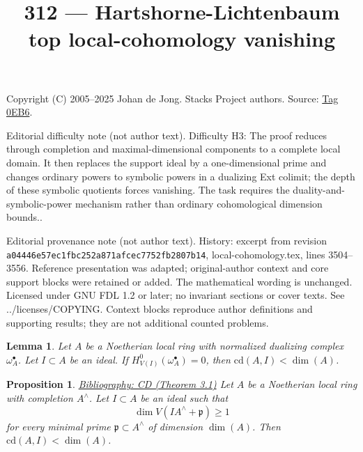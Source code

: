 \documentclass{amsart}
\newenvironment{reference}{\comment}{\endcomment}
\theoremstyle{plain}
\newtheorem{proposition}[subsection]{Proposition}
\newtheorem{lemma}[subsection]{Lemma}
\theoremstyle{definition}
\theoremstyle{remark}
\numberwithin{equation}{subsection}
\begin{document}
\title[Stacks Project, Tag 0EB6]{312 --- Hartshorne-Lichtenbaum top local-cohomology vanishing}
\maketitle
\noindent Copyright (C) 2005--2025 Johan de Jong. Stacks Project authors. Source: \href{https://stacks.math.columbia.edu/tag/0EB6}{Tag 0EB6}.

\noindent Editorial difficulty note (not author text). Difficulty H3: The proof reduces through completion and maximal-dimensional components to a complete local domain. It then replaces the support ideal by a one-dimensional prime and changes ordinary powers to symbolic powers in a dualizing Ext colimit; the depth of these symbolic quotients forces vanishing. The task requires the duality-and-symbolic-power mechanism rather than ordinary cohomological dimension bounds..

\noindent Editorial provenance note (not author text). History: excerpt from revision \texttt{a0444\allowbreak 6e57e\allowbreak c1fbc\allowbreak 252a8\allowbreak 71afc\allowbreak ec775\allowbreak 2fb28\allowbreak 07b14}, local-cohomology.tex, lines 3504--3556. Reference presentation was adapted; original-author context and core support blocks were retained or added. The mathematical wording is unchanged. Licensed under GNU FDL 1.2 or later; no invariant sections or cover texts. See ../licenses/COPYING. Context blocks reproduce author definitions and supporting results; they are not additional counted problems.

\begin{lemma}
\label{lemma-cd-bound-dualizing}
Let $A$ be a Noetherian local ring with
normalized dualizing complex $\omega_A^\bullet$.
Let $I \subset A$ be an ideal.
If $H^0_{V(I)}(\omega_A^\bullet) = 0$, then $\text{cd}(A, I) < \dim(A)$.
\end{lemma}

\begin{proposition}
\label{proposition-Hartshorne-Lichtenbaum-vanishing}
\begin{reference}
\href{https://stacks.math.columbia.edu/bibliography}{Bibliography: CD (Theorem 3.1)}
\end{reference}
Let $A$ be a Noetherian local ring with completion $A^\wedge$.
Let $I \subset A$ be an ideal such that
$$
\dim V(IA^\wedge + \mathfrak p) \geq 1
$$
for every minimal prime $\mathfrak p \subset A^\wedge$ of dimension $\dim(A)$.
Then $\text{cd}(A, I) < \dim(A)$.
\end{proposition}
\end{document}
